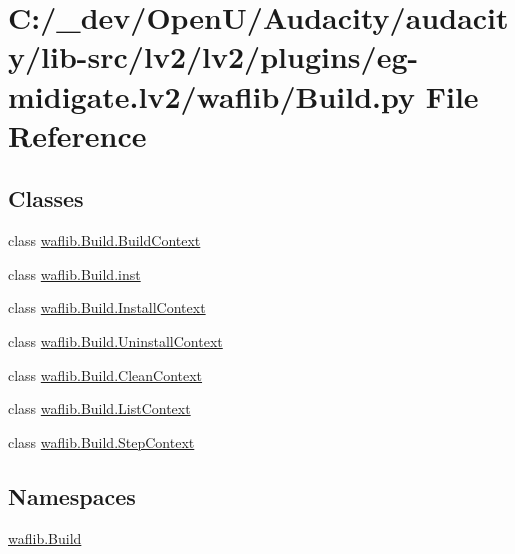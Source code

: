 \hypertarget{lv2_2plugins_2eg-midigate_8lv2_2waflib_2_build_8py}{}\section{C\+:/\+\_\+dev/\+Open\+U/\+Audacity/audacity/lib-\/src/lv2/lv2/plugins/eg-\/midigate.lv2/waflib/\+Build.py File Reference}
\label{lv2_2plugins_2eg-midigate_8lv2_2waflib_2_build_8py}
\subsection*{Classes}
\begin{DoxyCompactItemize}
\item 
class \hyperlink{classwaflib_1_1_build_1_1_build_context}{waflib.\+Build.\+Build\+Context}
\item 
class \hyperlink{classwaflib_1_1_build_1_1inst}{waflib.\+Build.\+inst}
\item 
class \hyperlink{classwaflib_1_1_build_1_1_install_context}{waflib.\+Build.\+Install\+Context}
\item 
class \hyperlink{classwaflib_1_1_build_1_1_uninstall_context}{waflib.\+Build.\+Uninstall\+Context}
\item 
class \hyperlink{classwaflib_1_1_build_1_1_clean_context}{waflib.\+Build.\+Clean\+Context}
\item 
class \hyperlink{classwaflib_1_1_build_1_1_list_context}{waflib.\+Build.\+List\+Context}
\item 
class \hyperlink{classwaflib_1_1_build_1_1_step_context}{waflib.\+Build.\+Step\+Context}
\end{DoxyCompactItemize}
\subsection*{Namespaces}
\begin{DoxyCompactItemize}
\item 
 \hyperlink{namespacewaflib_1_1_build}{waflib.\+Build}
\end{DoxyCompactItemize}
